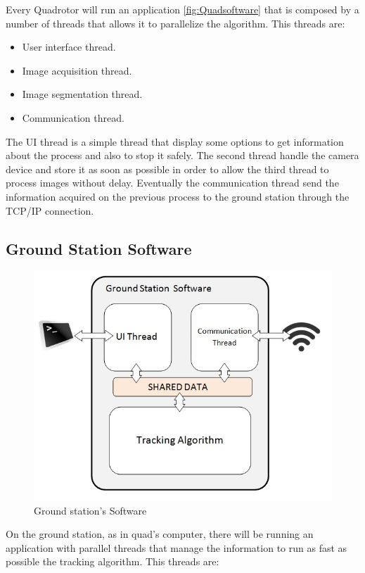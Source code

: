 	Every Quadrotor will run an application \ref{fig:Quadsoftware} that is composed by a number of threads that allows it to parallelize the algorithm. This threads are:
	
	
	\begin{itemize}
		\label{itemize:quadappthreads}
		\item User interface thread.
		\item Image acquisition thread.
		\item Image segmentation thread.
		\item Communication thread.
	\end{itemize}
	
	
	
	The UI thread is a simple thread that display some options to get information about the process and also to stop it safely. The second thread handle the camera device and store it as soon as possible in order to allow the third thread to process images without delay. Eventually the communication thread send the information acquired on the previous process to the ground station through the TCP/IP connection.
	
\subsection{Ground Station Software}
	\begin{figure}[hp]
		\begin{center}
			\includegraphics[width=0.7\linewidth]{../Images/c2/GroundStationsoftware}
		\end{center}
		\caption{Ground station's Software}
		\label{fig:GroundStation}
	\end{figure}

	On the ground station, as in quad's computer, there will be running an application with parallel threads that manage the information to run as fast as possible the tracking algorithm. This threads are:

